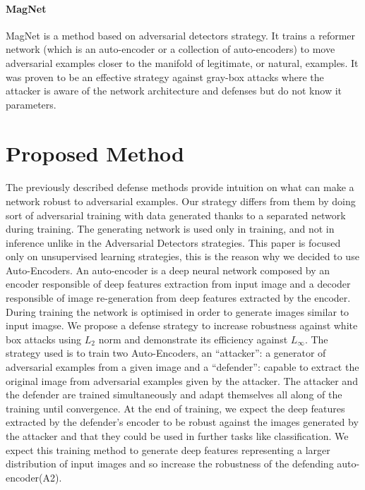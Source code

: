 \documentclass[12pt]{article}
\begin{document}
\paragraph{MagNet}
MagNet \cite{meng_magnet:_2017} is a method based on adversarial detectors strategy. It trains a reformer network (which is an auto-encoder or a collection of auto-encoders) to move adversarial examples closer to the manifold of legitimate, or natural, examples. It was proven to be an effective strategy against gray-box attacks where the attacker is aware of the network architecture and defenses but do not know it parameters.


\section{Proposed Method}
\paragraph{}
The previously described defense methods provide intuition on what can make a network robust to adversarial examples. Our strategy differs from them by doing sort of adversarial training with data generated thanks to a separated network during training. The generating network is used only in training, and not in inference unlike in the Adversarial Detectors strategies. This paper is focused only on unsupervised learning strategies, this is the reason why we decided to use Auto-Encoders. An auto-encoder is a deep neural network composed by an encoder responsible of deep features extraction from input image and a decoder responsible of image re-generation from deep features extracted by the encoder. During training the network is optimised in order to generate images similar to input imagse.
We propose a defense strategy to increase robustness against white box attacks using $L_{2}$ norm and demonstrate its efficiency against $L_{\infty}$. The strategy used is to train two Auto-Encoders, an “attacker”: a generator of adversarial examples from a given image and a “defender”: capable to extract the original image from adversarial examples given by the attacker. The attacker and the defender are trained simultaneously and adapt themselves all along of the training until convergence. At the end of training, we expect the deep features extracted by the defender's encoder to be robust against the images generated by the attacker and that they could be used in further tasks like classification. We expect this training method to generate deep features representing a larger distribution of input images and so increase the robustness of the defending auto-encoder(A2).
\end{document}
